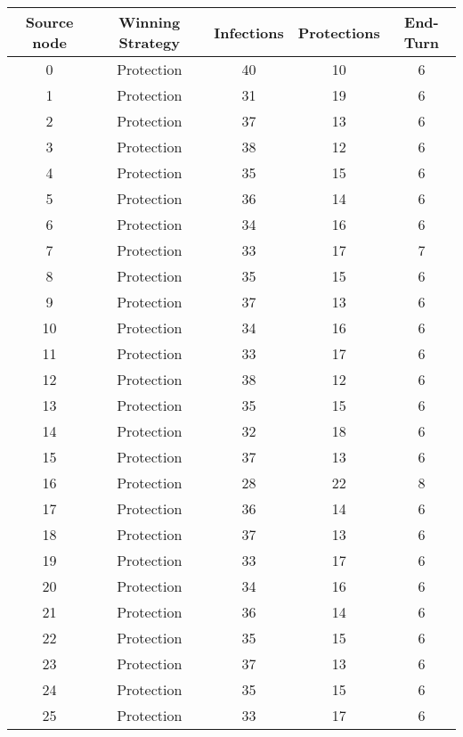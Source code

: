 \documentclass[results.tex]{subfiles}
\begin{document}
\begin{center}
  \begin{tabular}{| c || c | c | c | c |}
    \hline
    {\bfseries Source node} & {\bfseries Winning Strategy} & {\bfseries Infections} & {\bfseries Protections} & {\bfseries End-Turn} \\  %
    \hline\hline
    0 & Protection & 40 & 10 & 6 \\ 
    \hline
    1 & Protection & 31 & 19 & 6 \\ 
    \hline
    2 & Protection & 37 & 13 & 6 \\ 
    \hline
    3 & Protection & 38 & 12 & 6 \\ 
    \hline
    4 & Protection & 35 & 15 & 6 \\ 
    \hline
    5 & Protection & 36 & 14 & 6 \\ 
    \hline
    6 & Protection & 34 & 16 & 6 \\ 
    \hline
    7 & Protection & 33 & 17 & 7 \\ 
    \hline
    8 & Protection & 35 & 15 & 6 \\ 
    \hline
    9 & Protection & 37 & 13 & 6 \\ 
    \hline
    10 & Protection & 34 & 16 & 6 \\ 
    \hline
    11 & Protection & 33 & 17 & 6 \\ 
    \hline
    12 & Protection & 38 & 12 & 6 \\ 
    \hline
    13 & Protection & 35 & 15 & 6 \\ 
    \hline
    14 & Protection & 32 & 18 & 6 \\ 
    \hline
    15 & Protection & 37 & 13 & 6 \\ 
    \hline
    16 & Protection & 28 & 22 & 8 \\ 
    \hline
    17 & Protection & 36 & 14 & 6 \\ 
    \hline
    18 & Protection & 37 & 13 & 6 \\ 
    \hline
    19 & Protection & 33 & 17 & 6 \\ 
    \hline
    20 & Protection & 34 & 16 & 6 \\ 
    \hline
    21 & Protection & 36 & 14 & 6 \\ 
    \hline
    22 & Protection & 35 & 15 & 6 \\ 
    \hline
    23 & Protection & 37 & 13 & 6 \\ 
    \hline
    24 & Protection & 35 & 15 & 6 \\ 
    \hline
    25 & Protection & 33 & 17 & 6 \\ 

\end{tabular}
\end{center}
\end{document}
